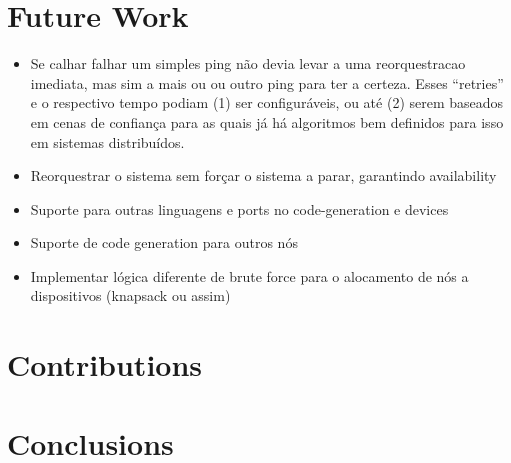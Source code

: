 \section{Future Work}
\begin{itemize}
    \item Se calhar falhar um simples ping não devia levar a uma reorquestracao imediata, mas sim a mais ou ou outro ping para ter a certeza. Esses “retries” e o respectivo tempo podiam (1) ser configuráveis, ou até (2) serem baseados em cenas de confiança para as quais já há algoritmos bem definidos para isso em sistemas distribuídos.
    \item Reorquestrar o sistema sem forçar o sistema a parar, garantindo availability
    \item Suporte para outras linguagens e ports no code-generation e devices
    \item Suporte de code generation para outros nós
    \item Implementar lógica diferente de brute force para o alocamento de nós a dispositivos (knapsack ou assim)
\end{itemize}


\section{Contributions}

\section{Conclusions}